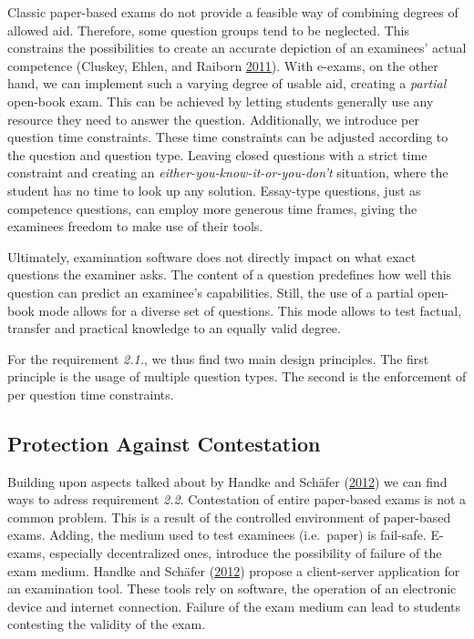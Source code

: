 Classic paper-based exams do not provide a feasible way of combining
degrees of allowed aid. Therefore, some question groups tend to be
neglected. This constrains the possibilities to create an accurate
depiction of an examinees' actual competence (Cluskey, Ehlen, and
Raiborn \protect\hyperlink{ref-Cluskey2011}{2011}). With e-exams, on the
other hand, we can implement such a varying degree of usable aid,
creating a \emph{partial} open-book exam. This can be achieved by
letting students generally use any resource they need to answer the
question. Additionally, we introduce per question time constraints.
These time constraints can be adjusted according to the question and
question type. Leaving closed questions with a strict time constraint
and creating an \emph{either-you-know-it-or-you-don't} situation, where
the student has no time to look up any solution. Essay-type questions,
just as competence questions, can employ more generous time frames,
giving the examinees freedom to make use of their tools.

Ultimately, examination software does not directly impact on what exact
questions the examiner asks. The content of a question predefines how
well this question can predict an examinee's capabilities. Still, the
use of a partial open-book mode allows for a diverse set of questions.
This mode allows to test factual, transfer and practical knowledge to an
equally valid degree.

For the requirement \emph{2.1.}, we thus find two main design
principles. The first principle is the usage of multiple question types.
The second is the enforcement of per question time constraints.

\hypertarget{protection-against-contestation}{%
\subsection{Protection Against
Contestation}\label{protection-against-contestation}}

Building upon aspects talked about by Handke and Schäfer
(\protect\hyperlink{ref-Handke2012}{2012}) we can find ways to adress
requirement \emph{2.2}. Contestation of entire paper-based exams is not
a common problem. This is a result of the controlled environment of
paper-based exams. Adding, the medium used to test examinees
(i.e.~paper) is fail-safe. E-exams, especially decentralized ones,
introduce the possibility of failure of the exam medium. Handke and
Schäfer (\protect\hyperlink{ref-Handke2012}{2012}) propose a
client-server application for an examination tool. These tools rely on
software, the operation of an electronic device and internet connection.
Failure of the exam medium can lead to students contesting the validity
of the exam.

